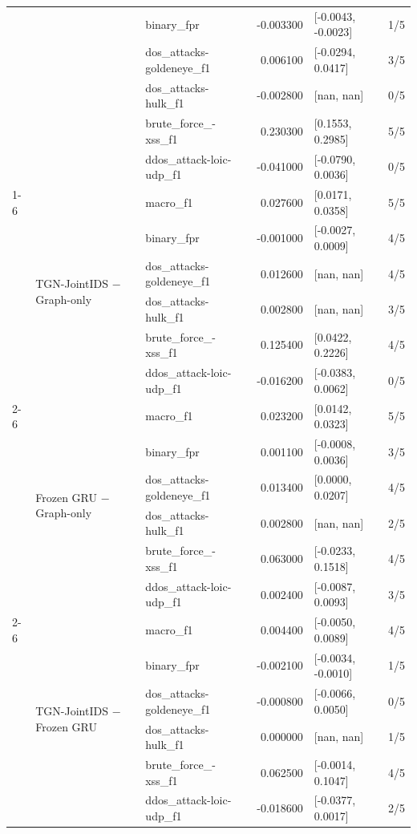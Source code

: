 \begin{table}
\begin{tabular}{lllrll}
 &  & binary\_fpr & -0.003300 & [-0.0043, -0.0023] & 1/5 \\
 &  & dos\_attacks-goldeneye\_f1 & 0.006100 & [-0.0294, 0.0417] & 3/5 \\
 &  & dos\_attacks-hulk\_f1 & -0.002800 & [nan, nan] & 0/5 \\
 &  & brute\_force\_-xss\_f1 & 0.230300 & [0.1553, 0.2985] & 5/5 \\
 &  & ddos\_attack-loic-udp\_f1 & -0.041000 & [-0.0790, 0.0036] & 0/5 \\
\cline{1-6} \cline{2-6}
\multirow[t]{24}{*}{60 min} & \multirow[t]{6}{*}{TGN-JointIDS − Graph-only} & macro\_f1 & 0.027600 & [0.0171, 0.0358] & 5/5 \\
 &  & binary\_fpr & -0.001000 & [-0.0027, 0.0009] & 4/5 \\
 &  & dos\_attacks-goldeneye\_f1 & 0.012600 & [nan, nan] & 4/5 \\
 &  & dos\_attacks-hulk\_f1 & 0.002800 & [nan, nan] & 3/5 \\
 &  & brute\_force\_-xss\_f1 & 0.125400 & [0.0422, 0.2226] & 4/5 \\
 &  & ddos\_attack-loic-udp\_f1 & -0.016200 & [-0.0383, 0.0062] & 0/5 \\
\cline{2-6}
 & \multirow[t]{6}{*}{Frozen GRU − Graph-only} & macro\_f1 & 0.023200 & [0.0142, 0.0323] & 5/5 \\
 &  & binary\_fpr & 0.001100 & [-0.0008, 0.0036] & 3/5 \\
 &  & dos\_attacks-goldeneye\_f1 & 0.013400 & [0.0000, 0.0207] & 4/5 \\
 &  & dos\_attacks-hulk\_f1 & 0.002800 & [nan, nan] & 2/5 \\
 &  & brute\_force\_-xss\_f1 & 0.063000 & [-0.0233, 0.1518] & 4/5 \\
 &  & ddos\_attack-loic-udp\_f1 & 0.002400 & [-0.0087, 0.0093] & 3/5 \\
\cline{2-6}
 & \multirow[t]{6}{*}{TGN-JointIDS − Frozen GRU} & macro\_f1 & 0.004400 & [-0.0050, 0.0089] & 4/5 \\
 &  & binary\_fpr & -0.002100 & [-0.0034, -0.0010] & 1/5 \\
 &  & dos\_attacks-goldeneye\_f1 & -0.000800 & [-0.0066, 0.0050] & 0/5 \\
 &  & dos\_attacks-hulk\_f1 & 0.000000 & [nan, nan] & 1/5 \\
 &  & brute\_force\_-xss\_f1 & 0.062500 & [-0.0014, 0.1047] & 4/5 \\
 &  & ddos\_attack-loic-udp\_f1 & -0.018600 & [-0.0377, 0.0017] & 2/5 \\

\end{tabular}
\end{table}
